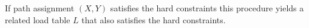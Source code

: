 If path assignment $(X,Y)$ satisfies the hard constraints this procedure yields a related load table  $L$  that also satisfies the hard constraints.
%
%
%
%
%
%
%
%
%
%
%
%



